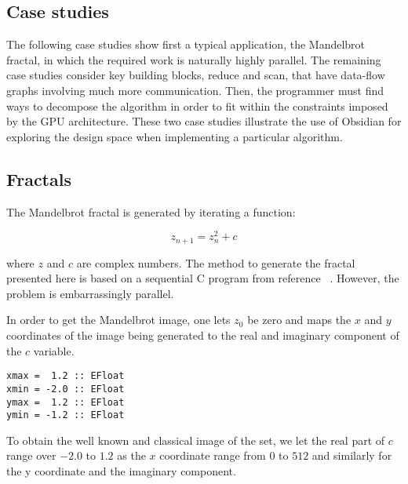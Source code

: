 \subsection{Case studies} 
\label{sec:CASESTUDIES}


The following case studies show first a typical application, the Mandelbrot fractal, in which the required work is naturally highly parallel.
The remaining case studies consider key building blocks, reduce and scan, that have data-flow graphs involving much more communication. Then, the programmer must find ways to decompose the algorithm in order to fit within
the constraints imposed by the GPU architecture. These two case studies illustrate the use of Obsidian for exploring the design space when implementing a particular algorithm.

\subsection{Fractals} 

The Mandelbrot fractal is generated by iterating a function: 

\begin{equation*} 
 z_{n+1} = z_n^2 + c
\end{equation*} 

\noindent where $z$ and $c$ are complex numbers. The method to generate the fractal 
presented here is based on a sequential C program from reference 
~\cite{Fractals}. However, the problem is embarrassingly parallel.

In order to get the Mandelbrot image, one lets $z_0$ be zero and maps the 
$x$ and $y$ coordinates of the image being generated to the real and imaginary 
component of the $c$ variable.

\begin{small}
\begin{verbatim} 
xmax =  1.2 :: EFloat
xmin = -2.0 :: EFloat
ymax =  1.2 :: EFloat
ymin = -1.2 :: EFloat
\end{verbatim}
\end{small} 

To obtain the well known and classical image of the set, we let 
the real part of $c$ range over $-2.0$ to $1.2$ as the $x$ coordinate range from
$0$ to $512$ and similarly for the y coordinate and the imaginary component.  


